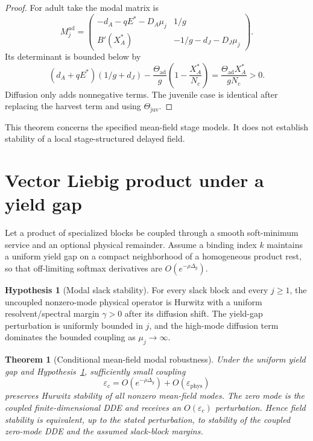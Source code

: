 \documentclass[11pt]{article}
\newtheorem{theorem}{Theorem}
\theoremstyle{definition}
\newtheorem{hypothesis}{Hypothesis}
\begin{document}
\begin{proof}
For adult take the modal matrix is
\[
M_j^{\mathrm{ad}}=
\begin{pmatrix}
-d_A-qE^*-D_A\mu_j&1/g\\
B'(X_A^*)&-1/g-d_J-D_J\mu_j
\end{pmatrix}.
\]
Its determinant is bounded below by
\[
(d_A+qE^*)(1/g+d_J)-\frac{\Theta_{\mathrm{ad}}}{g}
\left(1-\frac{X_A^*}{N_c}\right)
=\frac{\Theta_{\mathrm{ad}}X_A^*}{gN_c}>0.
\]
Diffusion only adds nonnegative terms. The juvenile case is identical after replacing the harvest term and using $\Theta_{\mathrm{juv}}$.\end{proof}

This theorem concerns the specified mean-field stage models. It does not establish stability of a local stage-structured delayed field.

\section{Vector Liebig product under a yield gap}
\label{sec:vector}

Let a product of specialized blocks be coupled through a smooth soft-minimum service and an optional physical remainder. Assume a binding index $k$ maintains a uniform yield gap on a compact neighborhood of a homogeneous product rest, so that off-limiting softmax derivatives are $O(e^{-\rho\Delta_y})$.

\begin{hypothesis}[Modal slack stability]
\label{hyp:modal-slack}
For every slack block and every $j\ge1$, the uncoupled nonzero-mode physical operator is Hurwitz with a uniform resolvent/spectral margin $\gamma>0$ after its diffusion shift. The yield-gap perturbation is uniformly bounded in $j$, and the high-mode diffusion term dominates the bounded coupling as $\mu_j\to\infty$.
\end{hypothesis}

\begin{theorem}[Conditional mean-field modal robustness]
\label{thm:vector}
Under the uniform yield gap and Hypothesis~\ref{hyp:modal-slack}, sufficiently small coupling
\[
\varepsilon_c=O(e^{-\rho\Delta_y})+O(\varepsilon_{\mathrm{phys}})
\]
preserves Hurwitz stability of all nonzero mean-field modes. The zero mode is the coupled finite-dimensional DDE and receives an $O(\varepsilon_c)$ perturbation. Hence field stability is equivalent, up to the stated perturbation, to stability of the coupled zero-mode DDE and the assumed slack-block margins.
\end{theorem}
\end{document}
